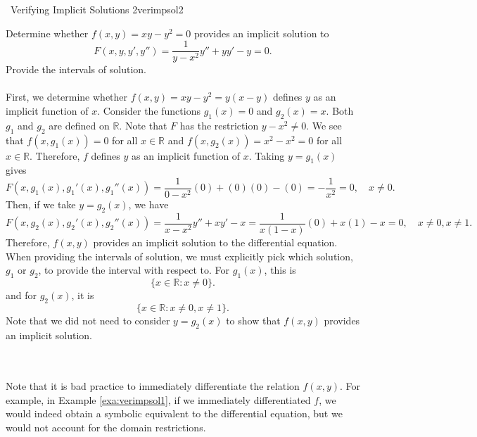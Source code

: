         \pagebreak
        \begin{example}{\Difficulty\,\Difficulty\,\,Verifying Implicit Solutions 2}{verimpsol2}
            
            Determine whether \(f(x,y)=xy-y^2=0\) provides an implicit solution to
            \begin{equation*}
                F(x,y,y',y'')=\frac{1}{y-x^2}y''+yy'-y=0.
            \end{equation*}
            Provide the intervals of solution.
            \\
            \\
            First, we determine whether \(f(x,y)=xy-y^2=y(x-y)\) defines \(y\) as an implicit function of \(x\). Consider the functions \(g_1(x)=0\) and \(g_2(x)=x\). Both \(g_1\) and \(g_2\) are defined on \(\mathbb{R}\). Note that \(F\) has the restriction \(y-x^2\neq0\). We see that \(f(x,g_1(x))=0\) for all \(x\in\mathbb{R}\) and \(f(x,g_2(x))=x^2-x^2=0\) for all \(x\in\mathbb{R}\). Therefore, \(f\) defines \(y\) as an implicit function of \(x\). Taking \(y=g_1(x)\) gives
            \begin{equation*}
                F(x,g_1(x),g_1'(x),g_1''(x))=\frac{1}{0-x^2}(0)+(0)(0)-(0)=-\frac{1}{x^2}=0,\quad x\neq0.
            \end{equation*}
            Then, if we take \(y=g_2(x)\), we have
            \begin{equation*}
                F(x,g_2(x),g_2'(x),g_2''(x))=\frac{1}{x-x^2}y''+xy'-x=\frac{1}{x(1-x)}(0)+x(1)-x=0, \quad x\neq 0,x\neq 1.
            \end{equation*}
            Therefore, \(f(x,y)\) provides an implicit solution to the differential equation. When providing the intervals of solution, we must explicitly pick which solution, \(g_1\) or \(g_2\), to provide the interval with respect to. For \(g_1(x)\), this is 
            \begin{equation*}
                \{x\in\mathbb{R}:x\neq0\}.
            \end{equation*}
            and for \(g_2(x)\), it is
            \begin{equation*}
                \{x\in\mathbb{R}:x\neq0,x\neq 1\}.
            \end{equation*}
            Note that we did not need to consider \(y=g_2(x)\) to show that \(f(x,y)\) provides an implicit solution.
        \end{example}
        \vphantom
        \\
        \\
        Note that it is bad practice to immediately differentiate the relation \(f(x,y)\). For example, in Example \ref{exa:verimpsol1}, if we immediately differentiated \(f\), we would indeed obtain a symbolic equivalent to the differential equation, but we would not account for the domain restrictions.


